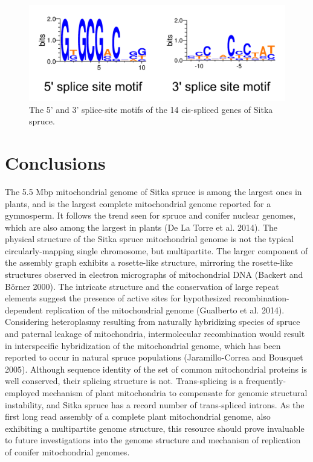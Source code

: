 \documentclass[
  12pt,
  oneside,
  openany]{book}
\begin{document}
\begin{figure}
\hypertarget{fig:splice}{%
\centering
\includegraphics{psitchensismt/splice.png}
\caption[The 5' and 3' splice-site motifs of the 14 cis-spliced genes of Sitka spruce.]{The 5' and 3' splice-site motifs of the 14 cis-spliced genes of Sitka spruce.}\label{fig:splice}
}
\end{figure}

\hypertarget{conclusions-4}{%
\section{Conclusions}\label{conclusions-4}}

The 5.5 Mbp mitochondrial genome of Sitka spruce is among the largest ones in plants, and is the largest complete mitochondrial genome reported for a gymnosperm. It follows the trend seen for spruce and conifer nuclear genomes, which are also among the largest in plants (De La Torre et al. 2014). The physical structure of the Sitka spruce mitochondrial genome is not the typical circularly-mapping single chromosome, but multipartite. The larger component of the assembly graph exhibits a rosette-like structure, mirroring the rosette-like structures observed in electron micrographs of mitochondrial DNA (Backert and Börner 2000). The intricate structure and the conservation of large repeat elements suggest the presence of active sites for hypothesized recombination-dependent replication of the mitochondrial genome (Gualberto et al. 2014). Considering heteroplasmy resulting from naturally hybridizing species of spruce and paternal leakage of mitochondria, intermolecular recombination would result in interspecific hybridization of the mitochondrial genome, which has been reported to occur in natural spruce populations (Jaramillo-Correa and Bousquet 2005). Although sequence identity of the set of common mitochondrial proteins is well conserved, their splicing structure is not. Trans-splicing is a frequently-employed mechanism of plant mitochondria to compensate for genomic structural instability, and Sitka spruce has a record number of trans-spliced introns. As the first long read assembly of a complete plant mitochondrial genome, also exhibiting a multipartite genome structure, this resource should prove invaluable to future investigations into the genome structure and mechanism of replication of conifer mitochondrial genomes.
\end{document}
